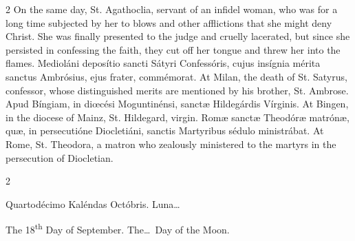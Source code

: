 \begin{paracol}{2}
\switchcolumn
{}
On the same day, St. Agathoclia, 
 servant of an infidel woman, who was for a long time subjected by her to 
 blows and other afflictions that she might deny Christ. She was 
 finally presented to the judge and cruelly lacerated, but since she 
 persisted in confessing the faith, they cut off her tongue and threw her 
 into the flames.
\switchcolumn*
{}
Medioláni deposítio 
 sancti Sátyri Confessóris, cujus insígnia mérita sanctus Ambrósius, ejus 
 frater, commémorat.
\switchcolumn
{}
At Milan, the death of St. Satyrus, 
 confessor, whose distinguished merits are mentioned by his brother, St. 
 Ambrose.
\switchcolumn*
{}
Apud Bíngiam, in 
 diœcési Moguntinénsi, sanctæ Hildegárdis Vírginis.
\switchcolumn
{}
At Bingen, in the diocese of Mainz, 
 St. Hildegard, virgin.
\switchcolumn*
{}
Romæ sanctæ Theodóræ 
 matrónæ, quæ, in persecutióne Diocletiáni, sanctis Martyribus sédulo 
 ministrábat.
\switchcolumn
{}
At Rome, St. Theodora, a matron who 
 zealously ministered to the martyrs in the persecution of Diocletian.
\switchcolumn*
{}
\end{paracol}


\begin{paracol}{2}
\begin{center}{\color{gregoriocolor} Quartodécimo Kaléndas Octóbris. 
 Luna\dots\ }\end{center}
\switchcolumn
{}
\begin{center}{\color{gregoriocolor} The   18\textsuperscript{th} Day of 
 September. The\dots\ Day of the Moon.}\end{center}
\end{paracol}

